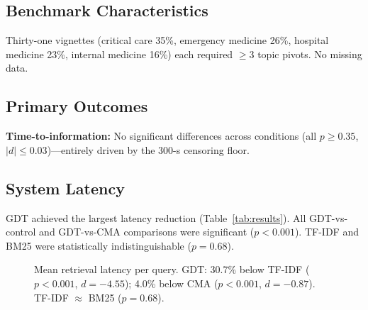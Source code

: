\documentclass[11pt,a4paper]{article}
\begin{document}
\subsection{Benchmark Characteristics}

Thirty-one vignettes (critical care 35\%, emergency medicine 26\%, hospital medicine 23\%, internal medicine 16\%) each required $\geq$3 topic pivots. No missing data.

\subsection{Primary Outcomes}

\textbf{Time-to-information:} No significant differences across conditions (all $p{\geq}0.35$, $|d|{\leq}0.03$)---entirely driven by the 300-s censoring floor.

\subsection{System Latency}

GDT achieved the largest latency reduction (Table~\ref{tab:results}). All GDT-vs-control and GDT-vs-CMA comparisons were significant ($p{<}0.001$). TF-IDF and BM25 were statistically indistinguishable ($p{=}0.68$).

\begin{figure}[!t]
  \centering
  \caption{Mean retrieval latency per query. GDT: 30.7\% below TF-IDF ($p{<}0.001$, $d{=}{-4.55}$); 4.0\% below CMA ($p{<}0.001$, $d{=}{-0.87}$). TF-IDF $\approx$ BM25 ($p{=}0.68$).}
  \label{fig:latency}
\end{figure}
\end{document}
